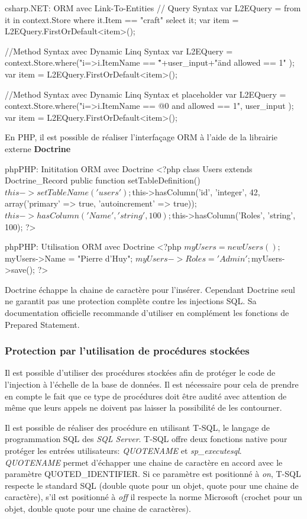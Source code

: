 \begin{Config}{csharp}{.NET: ORM avec Link-To-Entities}
    // Query Syntax
    var L2EQuery = from it in context.Store
    	where it.Item == "craft"
    	select it;
    var item = L2EQuery.FirstOrDefault<item>();
    
    //Method Syntax avec Dynamic Linq Syntax
    var L2EQuery = context.Store.where("i=>i.ItemName == \""+user_input+"\" and allowed == 1" );
    var item = L2EQuery.FirstOrDefault<item>();
    
    //Method Syntax avec Dynamic Linq Syntax et placeholder
    var L2EQuery = context.Store.where("i=>i.ItemName == @0 and allowed == 1", user_input );
    var item = L2EQuery.FirstOrDefault<item>();
\end{Config}

En PHP, il est possible de réaliser l'interfaçage ORM à l'aide de la librairie externe \textbf{Doctrine}
\begin{Config}{php}{PHP: Inititation ORM avec Doctrine}
<?php
class Users extends Doctrine_Record
{
    public function setTableDefinition()
    {
    	$this->setTableName('users');
	$this->hasColumn('id', 'integer', 42, array('primary' => true, 'autoincrement' => true));
	$this->hasColumn('Name', 'string', 100);
	$this->hasColumn('Roles', 'string', 100);
    }
}
?>
\end{Config}
\begin{Config}{php}{PHP: Utilisation ORM avec Doctrine}
<?php
$myUsers = new Users();
$myUsers->Name = "Pierre d'Huy"; 
$myUsers->Roles = 'Admin';
$myUsers->save();
?>
\end{Config}
Doctrine échappe la chaine de caractère pour l'insérer. Cependant Doctrine seul ne garantit pas une protection complète contre les injections SQL. Sa documentation officielle recommande d'utiliser en complément les fonctions de Prepared Statement.

\subsubsection{Protection par l'utilisation de procédures stockées}
Il est possible d'utiliser des procédures stockées afin de protéger le code de l'injection à l'échelle de la base de données. Il est nécessaire pour cela de prendre en compte le fait que ce type de procédures doit être audité avec attention de même que leurs appels ne doivent pas laisser la possibilité de les contourner.

Il est possible de réaliser des procédure en utilisant \gls{T-SQL}, le langage de programmation SQL des \textit{SQL Server}. \gls{T-SQL} offre deux fonctions native pour protéger les entrées utilisateurs: \textit{QUOTENAME} et \textit{sp\_executesql}.\\ \textit{QUOTENAME} permet d'échapper une chaine de caractère en accord avec le paramètre QUOTED\_IDENTIFIER. Si ce paramètre est positionné à \textit{on}, T-SQL respecte le standard SQL (double quote pour un objet, quote pour une chaine de caractère), s'il est positionné à \textit{off} il respecte la norme Microsoft (crochet pour un objet, double quote pour une chaine de caractères).


